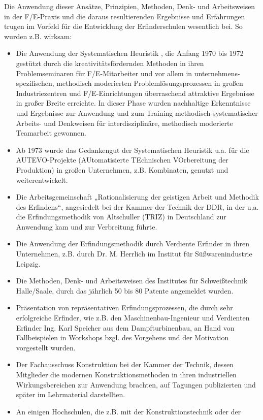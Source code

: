 \documentclass[11pt,a4paper]{article}
\begin{document}
Die Anwendung dieser Ansätze, Prinzipien, Methoden, Denk- und Arbeitsweisen in
der F/E-Praxis und die daraus resultierenden Ergebnisse und Erfahrungen trugen
im Vorfeld für die Entwicklung der Erfinderschulen wesentlich bei. So
wurden z.B. wirksam:
\begin{itemize}
\item Die Anwendung der Systematischen Heuristik \cite{2}, die Anfang 1970 bis
  1972 gestützt durch die kreativitätsfördernden Methoden in ihren
  Problemseminaren für F/E-Mit\-ar\-bei\-ter und vor allem in
  unternehmens-spezifischen, methodisch moderierten
  Problem\-lösungs\-prozessen in großen Industriezentren und F/E-Einrichtungen
  überraschend attraktive Ergebnisse in großer Breite erreichte. In dieser
  Phase wurden nachhaltige Erkenntnisse und Ergebnisse zur Anwendung und zum
  Training methodisch-systematischer Arbeits- und Denkweisen für
  interdisziplinäre, methodisch moderierte Teamarbeit gewonnen.
\item Ab 1973 wurde das Gedankengut der Systematischen Heuristik u.a. für die
  AUTEVO-Projekte (AUtomatisierte TEchnischen VOrbereitung der Produktion) in
  großen Unternehmen, z.B. Kombinaten, genutzt und weiterentwickelt.
\item Die Arbeitsgemeinschaft „Rationalisierung der geistigen Arbeit und
  Methodik des Erfindens“, angesiedelt bei der Kammer der Technik der DDR, in
  der u.a. die Erfindungsmethodik von Altschuller (TRIZ) \cite{3.1,20} in
  Deutschland zur Anwendung kam und zur Verbreitung führte.
\item Die Anwendung der Erfindungsmethodik durch Verdiente Erfinder in ihren
  Unternehmen, z.B. durch Dr. M. Herrlich im Institut für Süßwarenindustrie
  Leipzig.
\item Die Methoden, Denk- und Arbeitsweisen des Institutes für Schweißtechnik
  Halle/Saale, durch das jährlich 50 bis 80 Patente angemeldet wurden.
\item Präsentation von repräsentativen Erfindungsprozessen, die durch sehr
  erfolgreiche Erfinder, wie z.B. den Maschinenbau-Ingenieur und Verdienten
  Erfinder Ing. Karl Speicher aus dem Dampfturbinenbau, an Hand von
  Fallbeispielen in Workshops bzgl. des Vorgehens und der Motivation
  vorgestellt wurden.
\item Der Fachausschuss Konstruktion bei der Kammer der Technik, dessen
  Mitglieder die modernen Konstruktionsmethoden in ihren industriellen
  Wirkungsbereichen zur Anwendung brachten, auf Tagungen publizierten und
  später im Lehrmaterial darstellten.
\item An einigen Hochschulen, die z.B. mit der Konstruktionstechnik oder der

\end{itemize}
\end{document}
